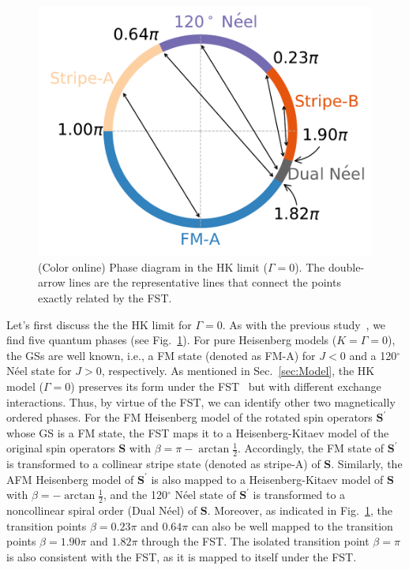 \documentclass[aps,prb,reprint,amsfonts,amsmath,amssymb,showpacs,groupedaddress,superscriptaddress]{revtex4-1}
\begin{document}
\begin{figure}
    \centering
    \includegraphics[width=\columnwidth]{fig/HKModel.pdf}
    \caption{\label{fig:HKModel}(Color online) Phase diagram in the HK limit ($\Gamma=0$). The double-arrow lines are the representative lines that connect the points exactly related by the FST.}
\end{figure}
Let's first discuss the the HK limit for $\Gamma=0$. As with the previous study~\cite{KaiLi2015}, we find five quantum phases (see Fig.~\ref{fig:HKModel}). For pure Heisenberg models ($K=\Gamma=0$), the GSs are well known, i.e., a FM state (denoted as FM-A) for $J<0$ and a 120$^\circ$ N\'{e}el state for $J>0$, respectively. As mentioned in Sec.~\ref{sec:Model}, the HK model ($\Gamma=0$) preserves its form under the FST~\cite{PhysRevB.89.014414} but with different exchange interactions. Thus, by virtue of the FST, we can identify other two magnetically ordered phases. For the FM Heisenberg model of the rotated spin operators $\bm{S}^{\prime}$ whose GS is a FM state, the FST maps it to a Heisenberg-Kitaev model of the original spin operators $\bm{S}$ with $\beta=\pi - \arctan\frac{1}{2}$. Accordingly, the FM state of $\bm{S}^{\prime}$ is transformed to a collinear stripe state (denoted as stripe-A) of $\bm{S}$. Similarly, the AFM Heisenberg model of $\bm{S}^{\prime}$ is also mapped to a Heisenberg-Kitaev model of $\bm{S}$ with $\beta=-\arctan\frac{1}{2}$, and the 120$^\circ$ N\'{e}el state of $\bm{S}^{\prime}$ is transformed to a noncollinear spiral order (Dual N\'{e}el) of $\bm{S}$. Moreover, as indicated in Fig.~\ref{fig:HKModel}, the transition points $\beta=0.23\pi$ and $0.64\pi$ can also be well mapped to the transition points $\beta=1.90\pi$ and $1.82\pi$ through the FST. The isolated transition point $\beta=\pi$ is also consistent with the FST, as it is mapped to itself under the FST.
\end{document}
